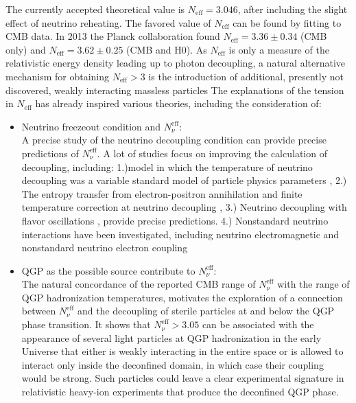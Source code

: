 \documentclass[universe,article,submit,moreauthors,pdftex,a4paper]{Definitions/mdpi}
\begin{document}
The currently accepted theoretical value is $N_\mathrm{eff}=3.046$, after including the slight effect of neutrino reheating. The favored value of $N_\mathrm{eff}$ can be found by fitting to CMB data. In 2013 the Planck collaboration found $N_\mathrm{eff}=3.36\pm0.34$ (CMB only) and $N_\mathrm{eff}=3.62\pm0.25$ (CMB and H0). As $N_\mathrm{eff}$ is only a measure of the relativistic energy density leading up to photon decoupling, a natural alternative mechanism for obtaining $N_\mathrm{eff}>3$ is the introduction of additional, presently not
discovered, weakly interacting massless particles \cite{Anchordoqui:2011nh,Abazajian:2012ys,Anchordoqui:2012qu,Steigman:2013yua,Giusarma:2014zza}
 The explanations of the tension in $N_\mathrm{eff}$ has already inspired various theories, including the consideration of:
\begin{itemize}
\item Neutrino freezeout condition and $N_\nu^{\mathrm{eff}}$:\\
A precise study of the neutrino decoupling condition can provide precise predictions of $N_\nu^{\mathrm{eff}}$. A lot of studies focus on improving the calculation of decoupling, including:
1.)model in which the temperature of neutrino decoupling was a variable standard model of particle physics parameters \cite{Birrell:2014uka,Birrell:2014ona}, 2.) The entropy transfer from electron-positron annihilation and finite temperature correction at neutrino decoupling \cite{Dicus:1982bz,Heckler:1994tv,Fornengo:1997wa}, 3.) Neutrino decoupling with flavor oscillations \cite{Mangano:2005cc,Mangano:2001iu}, provide precise predictions. 4.) Nonstandard neutrino interactions have been investigated, including neutrino electromagnetic \cite{Mangano:2006ar,Morgan:1981zy,Elmfors:1997tt,Fukugita:1987uy,Giunti:2008ve,Vogel:1989iv} and nonstandard neutrino electron coupling \cite{Mangano:2006ar}
\item QGP as the possible source contribute to $N_\nu^{\mathrm{eff}}$:\\
The natural concordance of the reported CMB range of $N_\nu^{\mathrm{eff}}$ with the range of QGP hadronization temperatures, motivates the exploration of a connection between $N_\nu^{\mathrm{eff}}$ and the decoupling of sterile particles at and below the QGP phase transition\cite{Birrell:2014cja}. It shows that $N_\nu^{\mathrm{eff}}>3.05$ can be associated with the appearance of several light particles at QGP hadronization in the early Universe that either is weakly interacting in the entire space or is allowed to interact only inside the deconfined domain, in which case their coupling would be strong. Such particles could leave a clear experimental signature in relativistic heavy-ion experiments that produce the deconfined QGP phase.


\end{itemize}
\end{document}
